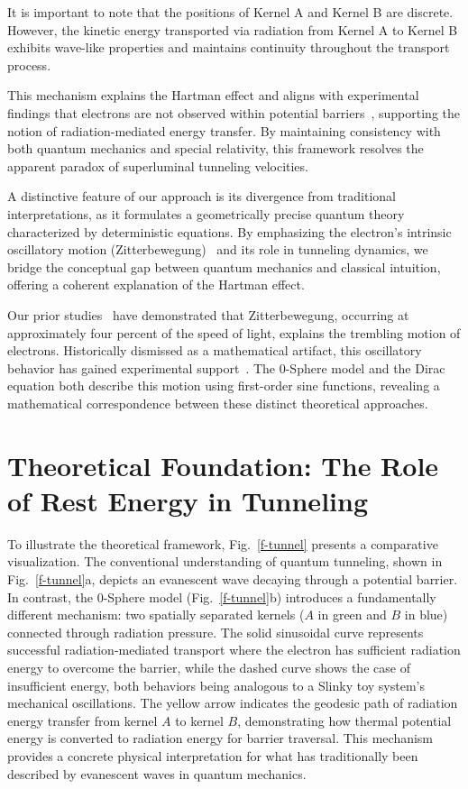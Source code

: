 \documentclass[%
 reprint,
 amsmath,amssymb,
 aps,
]{revtex4-1}
\numberwithin{equation}{section}%
\begin{document}
It is important to note that the positions of Kernel A and Kernel B are discrete. However, the kinetic energy transported via radiation from Kernel A to Kernel B exhibits wave-like properties and maintains continuity throughout the transport process.

This mechanism explains the Hartman effect and aligns with experimental findings that electrons are not observed within potential barriers~\cite{steinberg1993}, supporting the notion of radiation-mediated energy transfer. By maintaining consistency with both quantum mechanics and special relativity, this framework resolves the apparent paradox of superluminal tunneling velocities.

A distinctive feature of our approach is its divergence from traditional interpretations, as it formulates a geometrically precise quantum theory characterized by deterministic equations. By emphasizing the electron’s intrinsic oscillatory motion (Zitterbewegung)~\cite{breit1928, schrodinger1930} and its role in tunneling dynamics, we bridge the conceptual gap between quantum mechanics and classical intuition, offering a coherent explanation of the Hartman effect.

Our prior studies~\cite{hanamura2023} have demonstrated that Zitterbewegung, occurring at approximately four percent of the speed of light, explains the trembling motion of electrons. Historically dismissed as a mathematical artifact, this oscillatory behavior has gained experimental support~\cite{gerritsma2010, zawadzki2011}. The 0-Sphere model and the Dirac equation both describe this motion using first-order sine functions, revealing a mathematical correspondence between these distinct theoretical approaches.


\section{Theoretical Foundation: The Role of Rest Energy in Tunneling}
\label{sec:Theoretical Foundation}


To illustrate the theoretical framework, Fig.~\ref{f-tunnel} presents a comparative visualization. The conventional understanding of quantum tunneling, shown in Fig.~\ref{f-tunnel}a, depicts an evanescent wave decaying through a potential barrier. In contrast, the 0-Sphere model (Fig.~\ref{f-tunnel}b) introduces a fundamentally different mechanism: two spatially separated kernels ($A$ in green and $B$ in blue) connected through radiation pressure. The solid sinusoidal curve represents successful radiation-mediated transport where the electron has sufficient radiation energy to overcome the barrier, while the dashed curve shows the case of insufficient energy, both behaviors being analogous to a Slinky toy system's mechanical oscillations. The yellow arrow indicates the geodesic path of radiation energy transfer from kernel $A$ to kernel $B$, demonstrating how thermal potential energy is converted to radiation energy for barrier traversal. This mechanism provides a concrete physical interpretation for what has traditionally been described by evanescent waves in quantum mechanics.
\end{document}
